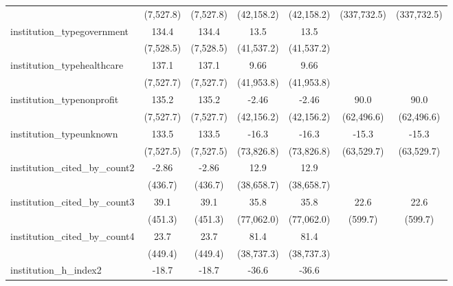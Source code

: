 \begin{tabular}{lcccccc}
                                         & (7,527.8)   & (7,527.8)   & (42,158.2)  & (42,158.2)  & (337,732.5) & (337,732.5)\\   
   institution\_typegovernment           & 134.4       & 134.4       & 13.5        & 13.5        &             &   \\   
                                         & (7,528.5)   & (7,528.5)   & (41,537.2)  & (41,537.2)  &             &   \\   
   institution\_typehealthcare           & 137.1       & 137.1       & 9.66        & 9.66        &             &   \\   
                                         & (7,527.7)   & (7,527.7)   & (41,953.8)  & (41,953.8)  &             &   \\   
   institution\_typenonprofit            & 135.2       & 135.2       & -2.46       & -2.46       & 90.0        & 90.0\\   
                                         & (7,527.7)   & (7,527.7)   & (42,156.2)  & (42,156.2)  & (62,496.6)  & (62,496.6)\\   
   institution\_typeunknown              & 133.5       & 133.5       & -16.3       & -16.3       & -15.3       & -15.3\\   
                                         & (7,527.5)   & (7,527.5)   & (73,826.8)  & (73,826.8)  & (63,529.7)  & (63,529.7)\\   
   institution\_cited\_by\_count2        & -2.86       & -2.86       & 12.9        & 12.9        &             &   \\   
                                         & (436.7)     & (436.7)     & (38,658.7)  & (38,658.7)  &             &   \\   
   institution\_cited\_by\_count3        & 39.1        & 39.1        & 35.8        & 35.8        & 22.6        & 22.6\\   
                                         & (451.3)     & (451.3)     & (77,062.0)  & (77,062.0)  & (599.7)     & (599.7)\\   
   institution\_cited\_by\_count4        & 23.7        & 23.7        & 81.4        & 81.4        &             &   \\   
                                         & (449.4)     & (449.4)     & (38,737.3)  & (38,737.3)  &             &   \\   
   institution\_h\_index2                & -18.7       & -18.7       & -36.6       & -36.6       &             &   \\   

\end{tabular}
